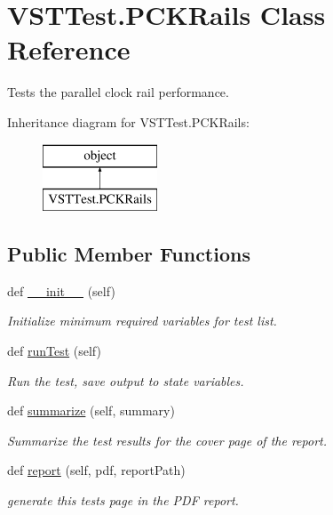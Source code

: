 \hypertarget{class_v_s_t_test_1_1_p_c_k_rails}{}\section{V\+S\+T\+Test.\+P\+C\+K\+Rails Class Reference}
\label{class_v_s_t_test_1_1_p_c_k_rails}


Tests the parallel clock rail performance.  


Inheritance diagram for V\+S\+T\+Test.\+P\+C\+K\+Rails\+:\begin{figure}[H]
\begin{center}
\leavevmode
\includegraphics[height=2.000000cm]{class_v_s_t_test_1_1_p_c_k_rails}
\end{center}
\end{figure}
\subsection*{Public Member Functions}
\begin{DoxyCompactItemize}
\item 
def \hyperlink{class_v_s_t_test_1_1_p_c_k_rails_a4987db68048645a88d3bcf997b2dd025}{\+\_\+\+\_\+init\+\_\+\+\_\+} (self)
\begin{DoxyCompactList}\small\item\em Initialize minimum required variables for test list. \end{DoxyCompactList}\item 
def \hyperlink{class_v_s_t_test_1_1_p_c_k_rails_a9f2e2cb16e1fc652bf616bda7a61b35b}{run\+Test} (self)
\begin{DoxyCompactList}\small\item\em Run the test, save output to state variables. \end{DoxyCompactList}\item 
def \hyperlink{class_v_s_t_test_1_1_p_c_k_rails_a848e1924e7e16672cea96152ba852387}{summarize} (self, summary)
\begin{DoxyCompactList}\small\item\em Summarize the test results for the cover page of the report. \end{DoxyCompactList}\item 
def \hyperlink{class_v_s_t_test_1_1_p_c_k_rails_a9cda7cc2d2094acd84397e4ace3a34e9}{report} (self, pdf, report\+Path)
\begin{DoxyCompactList}\small\item\em generate this test\textquotesingle{}s page in the P\+DF report. \end{DoxyCompactList}\end{DoxyCompactItemize}


